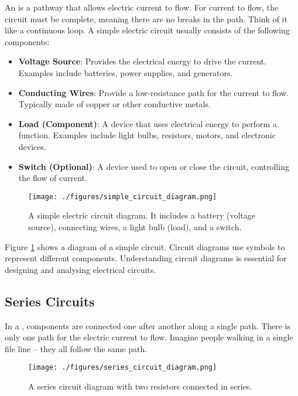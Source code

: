 An  is a pathway that allows electric current to flow. For current to flow, the circuit must be complete, meaning there are no breaks in the path.  Think of it like a continuous loop.  A simple electric circuit usually consists of the following components:

\begin{itemize}
    \item \textbf{Voltage Source}: Provides the electrical energy to drive the current. Examples include batteries, power supplies, and generators.
    \item \textbf{Conducting Wires}: Provide a low-resistance path for the current to flow. Typically made of copper or other conductive metals.
    \item \textbf{Load (Component)}:  A device that uses electrical energy to perform a function. Examples include light bulbs, resistors, motors, and electronic devices.
    \item \textbf{Switch (Optional)}: A device used to open or close the circuit, controlling the flow of current.
\end{itemize}

\begin{figure}[h]
    \centering
    \texttt{[image: ./figures/simple\_circuit\_diagram.png]}
    \caption{A simple electric circuit diagram. It includes a battery (voltage source), connecting wires, a light bulb (load), and a switch.}
    \label{fig:simple_circuit}
\end{figure}

Figure \ref{fig:simple_circuit} shows a diagram of a simple circuit.  Circuit diagrams use symbols to represent different components.  Understanding circuit diagrams is essential for designing and analysing electrical circuits.

\subsection{Series Circuits}

In a , components are connected one after another along a single path.  There is only one path for the electric current to flow.  Imagine people walking in a single file line – they all follow the same path.

\begin{figure}[h]
    \centering
    \texttt{[image: ./figures/series\_circuit\_diagram.png]}
    \caption{A series circuit diagram with two resistors connected in series.}
    \label{fig:series_circuit}
\end{figure}

